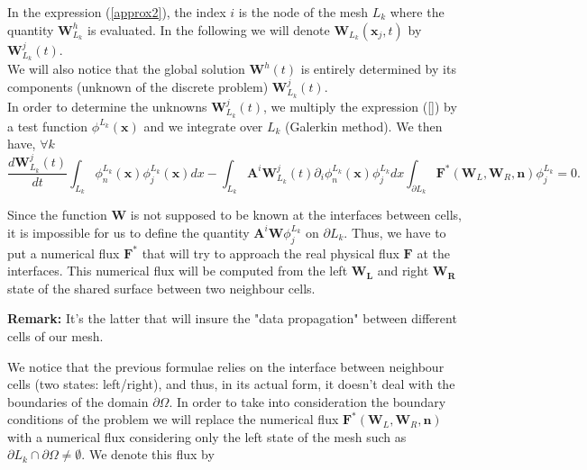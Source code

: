\documentclass[a4paper,oneside,10pt]{report}
\begin{document}
In the expression (\ref{approx2}), the index $i$ is the node of the mesh $L_k$ where the quantity $\mathbf{W}^h_{L_k}$ is evaluated. In the following we will denote $\mathbf{W}_{L_k}(\mathbf{x}_j,t)$ by $\mathbf{W}_{L_k}^j(t)$.\\
We will also notice that the global solution $\mathbf{W}^h(t)$ is entirely determined by its components (unknown of the discrete problem) $\mathbf{W}_{L_k}^j(t)$.\\

In order to determine the unknowns $\mathbf{W}_{L_k}^j(t)$, we multiply the expression  (\ref{}) by a test function $\phi^{L_k}(\mathbf{x})$ and we integrate over $L_k$ (Galerkin method). We then have,  $\forall k$
\begin{equation}
\label{schema}
\frac{d\mathbf{W}_{L_k}^j(t)}{dt}\int_{L_k}\phi^{L_k}_n(\mathbf{x}) \phi^{L_k}_j(\mathbf{x})dx - \int_{L_k}  \mathbf{A}^i \mathbf{W}_{L_k}^j(t)\partial_i \phi^{L_k}_n(\mathbf{x}) \phi^{L_k}_j dx  \int_{\partial L_k} \mathbf{F}^*( \mathbf{W}_L,\mathbf{W}_R,\mathbf{n}) \phi^{L_k}_j= 0.
\end{equation}


Since the function $\mathbf{W}$ is not supposed to be known at the interfaces between cells, it is impossible for us to define the quantity $\mathbf{A}^i \mathbf{W}\phi_j^{L_k}$ on $\partial L_k$. Thus, we have to put a numerical flux $\mathbf{F}^*$ that will try to approach the real physical flux $\mathbf{F}$ at the interfaces. This numerical flux will be computed from the left $\mathbf{W_L}$ and right $\mathbf{W_R}$ state of the shared surface between two neighbour cells.
\newline

\textbf{Remark:} It's the latter that will insure the "data propagation" between different cells of our mesh.


We notice that the previous formulae relies on the interface between neighbour cells (two states: left/right), and thus, in its  actual form, it doesn't deal with the boundaries of the domain $\partial \Omega$. In order to take into consideration the boundary conditions of the problem we will replace the numerical flux $\mathbf{F}^*( \mathbf{W}_L,\mathbf{W}_R,\mathbf{n})$ with a numerical flux considering only the left state of the mesh such as $\partial L_k \cap \partial \Omega \neq \emptyset$. We denote this flux by 
\end{document}
